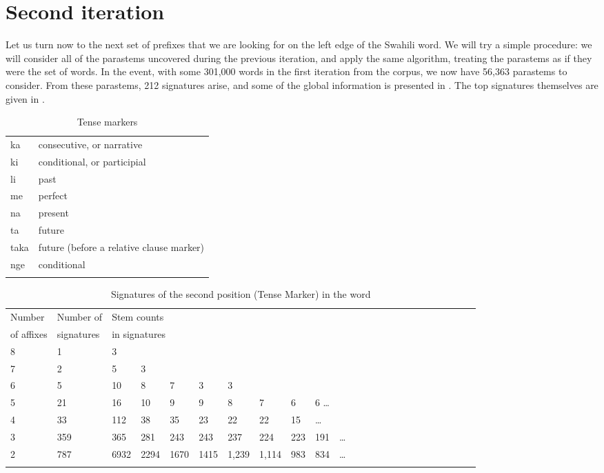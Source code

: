 \documentclass[output=paper,colorlinks,citecolor=brown]{langscibook}
\begin{document}
\section{Second iteration}

Let us turn now to the next set of prefixes that we are looking for on the left edge of the Swahili word. We will try a simple procedure: we will consider all of the parastems uncovered during the previous iteration, and apply the same algorithm, treating the parastems as if they were the set of words. In the event, with some 301,000 words in the first iteration from the corpus, we now have 56,363 parastems to consider. From these parastems, 212 signatures arise, and some of the global information is presented in . The top signatures themselves are given in .


\begin{table}
\begin{center}
\begin{tabular}{ll}\lsptoprule
ka &  consecutive, or narrative \\
ki&  conditional, or participial  \\
li&  past \\
me& perfect  \\
na&  present  \\
ta & future \\
taka&  future (before a relative clause marker) \\
nge & conditional \\\lspbottomrule
\end{tabular}
\caption{Tense markers}
\label{TMs}
\end{center}
\end{table} 

\begin{table}[!htbp]
\begin{tabular}{llllllllllllllllllllllll} \lsptoprule
Number  &  Number of  & \multicolumn{8}{l}{Stem counts } \\
 of affixes &   signatures & \multicolumn{8}{l}{in signatures} \\ \midrule
8 & 1 & 3  \\
7 & 2 & 5 & 3 \\
6 & 5 & 10 & 8 & 7 & 3 & 3 \\
5 & 21 & 16 & 10 &  9 &  9 &  8 & 7 & 6 &  6   \ldots \\
4 & 33 & 112 & 38 & 35 & 23 & 22 & 22 & 15 &  \ldots\\
3 & 359 & 365 & 281 & 243 & 243 & 237  & 224 & 223 & 191 &  \ldots\\
2 &  787 &6932& 2294 & 1670 & 1415 & 1,239 & 1,114 & 983 & 834  & \ldots \\ \lspbottomrule
\end{tabular}
\caption{Signatures of the second position (Tense Marker) in the word}
\label{TM-table}
\end{table}
\end{document}

